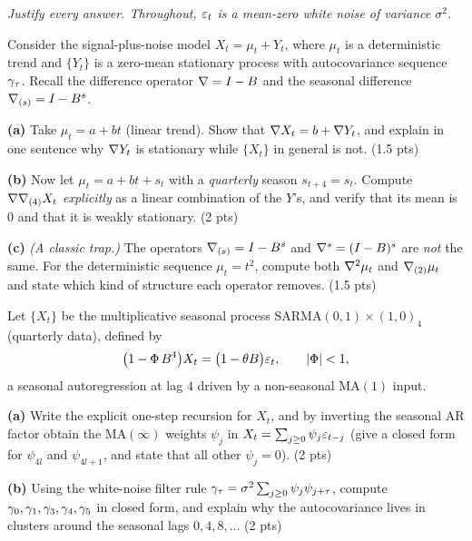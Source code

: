 \documentclass[11pt]{article}
\begin{document}
\pointstable
\begin{center}\itshape Justify every answer. Throughout, $\varepsilon_t$ is a mean-zero white noise of variance $\sigma^2$.\end{center}

Consider the signal-plus-noise model $X_t=\mu_t+Y_t$, where $\mu_t$ is a deterministic trend and $\{Y_t\}$ is a zero-mean stationary process with autocovariance sequence $\gamma_\tau$. Recall the difference operator $\nabla=I-B$ and the seasonal difference $\nabla_{(s)}=I-B^{s}$.

\textbf{(a)} Take $\mu_t=a+bt$ (linear trend). Show that $\nabla X_t=b+\nabla Y_t$, and explain in one sentence why $\nabla Y_t$ is stationary while $\{X_t\}$ in general is not. \hfill(1.5 pts)

\textbf{(b)} Now let $\mu_t=a+bt+s_t$ with a \emph{quarterly} season $s_{t+4}=s_t$. Compute $\nabla\nabla_{(4)}X_t$ \emph{explicitly} as a linear combination of the $Y$'s, and verify that its mean is $0$ and that it is weakly stationary. \hfill(2 pts)

\textbf{(c)} \emph{(A classic trap.)} The operators $\nabla_{(s)}=I-B^{s}$ and $\nabla^{s}=(I-B)^{s}$ are \emph{not} the same. For the deterministic sequence $\mu_t=t^{2}$, compute both $\nabla^{2}\mu_t$ and $\nabla_{(2)}\mu_t$ and state which kind of structure each operator removes. \hfill(1.5 pts)
\answerpage

Let $\{X_t\}$ be the multiplicative seasonal process $\mathrm{SARMA}(0,1)\times(1,0)_{4}$ (quarterly data), defined by
\[
\bigl(1-\Phi\,B^{4}\bigr)X_t=\bigl(1-\theta B\bigr)\varepsilon_t,
\qquad \left\lvert \Phi \right\rvert<1 ,
\]
a seasonal autoregression at lag $4$ driven by a non-seasonal $\mathrm{MA}(1)$ input.

\textbf{(a)} Write the explicit one-step recursion for $X_t$, and by inverting the seasonal AR factor obtain the $\mathrm{MA}(\infty)$ weights $\psi_j$ in $X_t=\sum_{j\ge0}\psi_j\varepsilon_{t-j}$ (give a closed form for $\psi_{4l}$ and $\psi_{4l+1}$, and state that all other $\psi_j=0$). \hfill(2 pts)

\textbf{(b)} Using the white-noise filter rule $\gamma_\tau=\sigma^{2}\sum_{j\ge0}\psi_j\psi_{j+\tau}$, compute $\gamma_0,\gamma_1,\gamma_3,\gamma_4,\gamma_5$ in closed form, and explain why the autocovariance lives in clusters around the seasonal lags $0,4,8,\dots$ \hfill(2 pts)
\end{document}
